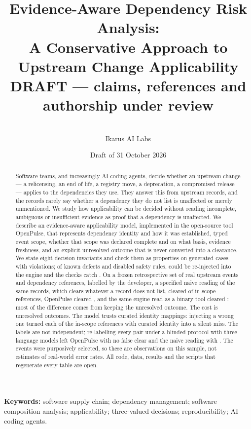 \documentclass[11pt]{article}
\title{Evidence-Aware Dependency Risk Analysis:\\
A Conservative Approach to Upstream Change Applicability\\[0.5em]
\large\textcolor{red!70!black}{DRAFT --- claims, references and authorship under review}}
\author{\draftnote{authors and affiliations to be confirmed}\\ Ikarus AI Labs}
\date{Draft of 31 October 2026}
\begin{document}
\maketitle

\begin{abstract}
Software teams, and increasingly AI coding agents, decide whether an upstream
change --- a relicensing, an end of life, a registry move, a deprecation, a
compromised release --- applies to the dependencies they use. They answer
this from upstream records, and the records rarely say whether a dependency
they do not list is unaffected or merely unmentioned. We study how applicability can be decided
without reading incomplete, ambiguous or insufficient evidence as proof that a
dependency is unaffected. We describe an evidence-aware applicability model,
implemented in the open-source tool OpenPulse, that represents dependency
identity and how it was established, typed event scope, whether that scope was
declared complete and on what basis, evidence freshness, and an explicit
unresolved outcome that is never converted into a clearance. We state eight
decision invariants and check them as properties on \InvCases{} generated
cases with \InvViolations{} violations; of \MutKnown{} known defects and
disabled safety rules, \MutTotal{} could be re-injected into the engine and
the checks catch \MutCaught{}. On a frozen retrospective set of
\RetroEvents{} real upstream events and \RetroPairs{} dependency references,
labelled by the developer, a specified naive reading of the same records,
which clears whatever a record does not list, cleared
\FCa{} of \RetroInScope{} in-scope references, OpenPulse cleared
\FCc{}, and the same engine read as a binary tool cleared \FCbinary{}: most of
the difference comes from keeping the unresolved outcome. The cost is
\UnresC{} unresolved outcomes. The model trusts curated identity mappings:
injecting a wrong one turned each of the \FaultMisInScope{} in-scope
references with curated identity into a silent miss. The labels are not
independent; re-labelling every pair under a blinded protocol with three
language models left OpenPulse with no false clear and the naive reading with
\LabFCaAP{}. The events were purposively selected, so these are
observations on this sample, not estimates of real-world error rates. All code, data, results and the scripts
that regenerate every table are open.
\end{abstract}

\noindent\textbf{Keywords:} software supply chain; dependency management;
software composition analysis; applicability; three-valued decisions;
reproducibility; AI coding agents.
\end{document}
